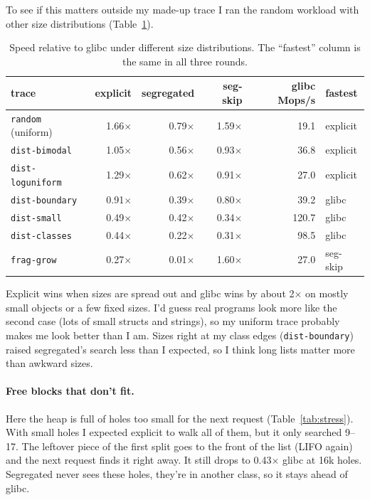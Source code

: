 \documentclass[11pt,letterpaper]{article}
\begin{document}
To see if this matters outside my made-up trace I ran the random workload with other size distributions (Table~\ref{tab:dist}).

\begin{table}[H]
\centering
\footnotesize
\begin{tabular}{@{}l r r r r l@{}}
\toprule
trace & explicit & segregated & seg-skip & glibc Mops/s & fastest \\
\midrule
\texttt{random} (uniform) & 1.66$\times$ & 0.79$\times$ & 1.59$\times$ & 19.1 & explicit \\
\texttt{dist-bimodal}     & 1.05$\times$ & 0.56$\times$ & 0.93$\times$ & 36.8 & explicit \\
\texttt{dist-loguniform}  & 1.29$\times$ & 0.62$\times$ & 0.91$\times$ & 27.0 & explicit \\
\texttt{dist-boundary}    & 0.91$\times$ & 0.39$\times$ & 0.80$\times$ & 39.2 & glibc \\
\texttt{dist-small}       & 0.49$\times$ & 0.42$\times$ & 0.34$\times$ & 120.7 & glibc \\
\texttt{dist-classes}     & 0.44$\times$ & 0.22$\times$ & 0.31$\times$ & 98.5 & glibc \\
\texttt{frag-grow}        & 0.27$\times$ & 0.01$\times$ & 1.60$\times$ & 27.0 & seg-skip \\
\bottomrule
\end{tabular}
\caption{Speed relative to glibc under different size distributions. The ``fastest'' column is the same in all three rounds.}
\label{tab:dist}
\end{table}

Explicit wins when sizes are spread out and glibc wins by about 2$\times$ on mostly small objects or a few fixed sizes. I'd guess real programs look more like the second case (lots of small structs and strings), so my uniform trace probably makes me look better than I am. Sizes right at my class edges (\texttt{dist-boundary}) raised segregated's search less than I expected, so I think long lists matter more than awkward sizes.

\paragraph{Free blocks that don't fit.} Here the heap is full of holes too small for the next request (Table~\ref{tab:stress}). With small holes I expected explicit to walk all of them, but it only searched 9--17. The leftover piece of the first split goes to the front of the list (LIFO again) and the next request finds it right away. It still drops to 0.43$\times$ glibc at 16k holes. Segregated never sees these holes, they're in another class, so it stays ahead of glibc.
\end{document}
